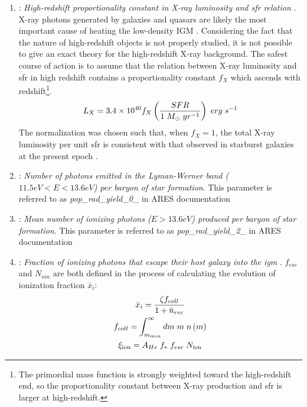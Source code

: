 \documentclass[12pt, TexShade, letterpaper]{report}
\begin{document}
\begin{enumerate}
    \item {}: \emph{High-redshift proportionality constant in X-ray luminosity and \gls{sfr} relation} \cite{ares_documentation}. 
    X-ray photons generated by galaxies and quasars are likely the most important cause of heating the low-density IGM \cite{low_frequency}. Considering the fact that the nature of high-redshift objects is not properly studied, it is not possible to give an exact theory for the high-redshift X-ray background. The safest course of action is to assume that the relation between X-ray luminosity and \gls{sfr} in high redshift contains a proportionality constant $f_X$ which ascends with redshift\footnote{The primordial mass function is strongly weighted toward the high-redshift end, so the proportionality constant between X-ray production and \gls{sfr} is larger at high-redshift.}.
    \begin{equation}
        L_X = 3.4 \times 10^{40} f_X \left( \frac{SFR}{1 \hspace{0.1cm} M_{\odot} \hspace{0.1cm} yr^{-1}}\right) \hspace{0.1cm} erg \hspace{0.1cm}s^{-1}
    \end{equation}
    The normalization was chosen such that, when $f_X =1$, the total X-ray luminosity per unit \gls{sfr} is consistent with that observed in starburst galaxies at the present epoch \cite{low_frequency, 21century}.
    
    \item {}: \emph{Number of photons emitted in the Lyman-Werner band ($11.5eV<E<13.6eV$) per baryon of star formation}. This parameter is referred to as \emph{pop\_rad\_yield\_0\_} in ARES documentation \cite{ares_documentation, lw_background}
    
    \item {}: \emph{Mean number of ionizing photons ($E>13.6eV$) produced per baryon of star formation}. This parameter is referred to as \emph{pop\_rad\_yield\_2\_} in ARES documentation \cite{ares_documentation, 21century}
    
    \item {}: \emph{Fraction of ionizing photons that escape their host galaxy into the \gls{igm}} \cite{ares_documentation}.
    $f_{esc}$ and $N_{ion}$ are both defined in the process of calculating the evolution of ionization fraction $\bar{x}_i$:
    \begin{gather}
        \bar{x}_i = \frac{\zeta f_{coll}}{1 + \bar{n}_{rec}}\\
        f_{coll} = \int_{m_{min}}^\infty dm \hspace{0.1cm} m \hspace{0.1cm} n\left(m\right)\\
        \xi_{\text{ion}} = A_{He} \hspace{0.1cm} f_* \hspace{0.1cm} f_{esc} \hspace{0.1cm} N_{\text{ion}} \label{eq:ionizing_efficiency}
    \end{gather}
    

\end{enumerate}
\end{document}

